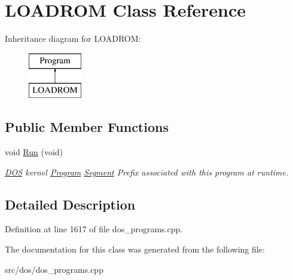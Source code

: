 \hypertarget{classLOADROM}{\section{L\-O\-A\-D\-R\-O\-M Class Reference}
\label{classLOADROM}
}
Inheritance diagram for L\-O\-A\-D\-R\-O\-M\-:\begin{figure}[H]
\begin{center}
\leavevmode
\includegraphics[height=2.000000cm]{classLOADROM}
\end{center}
\end{figure}
\subsection*{Public Member Functions}
\begin{DoxyCompactItemize}
\item 
\hypertarget{classLOADROM_a0d95e173ed8a5de685f6161ade6068f6}{void \hyperlink{classLOADROM_a0d95e173ed8a5de685f6161ade6068f6}{Run} (void)}\label{classLOADROM_a0d95e173ed8a5de685f6161ade6068f6}

\begin{DoxyCompactList}\small\item\em \hyperlink{classDOS}{D\-O\-S} kernel \hyperlink{classProgram}{Program} \hyperlink{structSegment}{Segment} Prefix associated with this program at runtime. \end{DoxyCompactList}\end{DoxyCompactItemize}


\subsection{Detailed Description}


Definition at line 1617 of file dos\-\_\-programs.\-cpp.



The documentation for this class was generated from the following file\-:\begin{DoxyCompactItemize}
\item 
src/dos/dos\-\_\-programs.\-cpp\end{DoxyCompactItemize}
